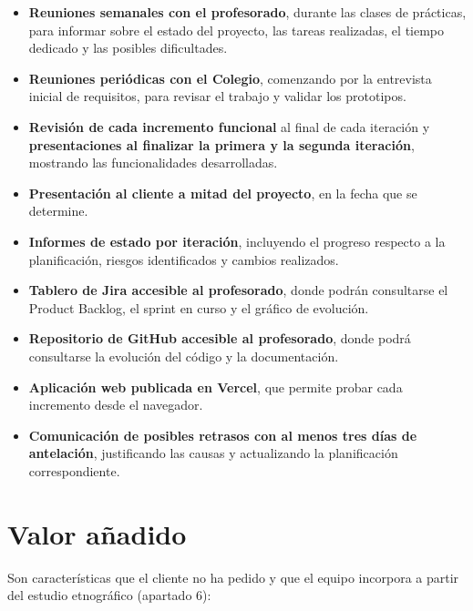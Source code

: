 \documentclass[11pt,a4paper]{article}
\newcommand{\hl}[1]{\textcolor{gblue}{\textbf{#1}}}
\begin{document}
\begin{itemize}
\item \hl{Reuniones semanales con el profesorado}, durante las clases de prácticas, para informar sobre el estado del proyecto, las tareas realizadas, el tiempo dedicado y las posibles dificultades.
\item \hl{Reuniones periódicas con el Colegio}, comenzando por la entrevista inicial de requisitos, para revisar el trabajo y validar los prototipos.
\item \hl{Revisión de cada incremento funcional} al final de cada iteración y \hl{presentaciones al finalizar la primera y la segunda iteración}, mostrando las funcionalidades desarrolladas.
\item \hl{Presentación al cliente a mitad del proyecto}, en la fecha que se determine.
\item \hl{Informes de estado por iteración}, incluyendo el progreso respecto a la planificación, riesgos identificados y cambios realizados.
\item \hl{Tablero de Jira accesible al profesorado}, donde podrán consultarse el Product Backlog, el sprint en curso y el gráfico de evolución.
\item \hl{Repositorio de GitHub accesible al profesorado}, donde podrá consultarse la evolución del código y la documentación.
\item \hl{Aplicación web publicada en Vercel}, que permite probar cada incremento desde el navegador.
\item \hl{Comunicación de posibles retrasos con al menos tres días de antelación}, justificando las causas y actualizando la planificación correspondiente.
\end{itemize}
\section{Valor añadido}
Son características que el cliente no ha pedido y que el equipo incorpora a partir del estudio etnográfico (apartado 6):
\end{document}
